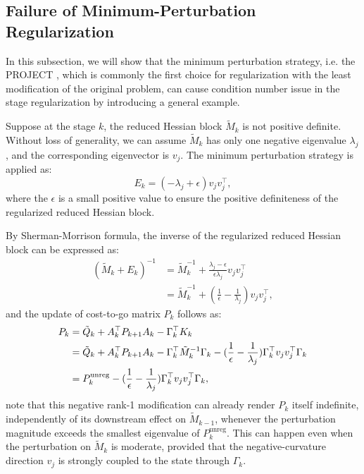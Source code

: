 \documentclass[class=scrbook, crop=false]{standalone}
\begin{document}
\subsection{Failure of Minimum-Perturbation Regularization}
In this subsection, we will show that the minimum perturbation strategy, i.e. the PROJECT \cite{verschueren2017sparsity}, 
which is commonly the first choice for regularization with the least modification of the original problem, 
can cause condition number issue in the stage regularization by introducing a general example.

Suppose at the stage $k$, the reduced Hessian block $\tilde{M}_k$ is not positive definite.
Without loss of generality, we can assume $\tilde{M}_k$ has only one negative eigenvalue $\lambda_j$, and the corresponding eigenvector is $v_j$.
The minimum perturbation strategy is applied as:
\begin{equation}
    E_k = (-\lambda_{j}+\epsilon) v_j v_j^\top,
\end{equation}
where the $\epsilon$ is a small positive value to ensure the positive definiteness of the regularized reduced Hessian block. 

By Sherman-Morrison formula, the inverse of the regularized reduced Hessian block can be expressed as:
\begin{align*}
    (\tilde{M}_k + E_k)^{-1} &= \tilde{M}_k^{-1} + \frac{\lambda_j-\epsilon}{\epsilon \lambda_j} v_j v_j^\top \\
                            &= \tilde{M}_k^{-1} + (\frac{1}{\epsilon} - \frac{1}{\lambda_j}) v_j v_j^\top,
\end{align*}
and the update of cost-to-go matrix $P_k$ follows as:
\begin{align}
    P_k &= \tilde{Q}_k + A_k^\top P_{k+1} A_k - \Gamma_k^\top K_k \notag \\
        &=\tilde{Q}_k + A_k^\top P_{k+1} A_k - \Gamma_k^\top \tilde{M}_k^{-1} \Gamma_k - (\frac{1}{\epsilon} - \frac{1}{\lambda_j}) \Gamma_k^\top v_j v_j^\top \Gamma_k \notag \\
        &= P_k^{\mathrm{unreg}} - (\frac{1}{\epsilon} - \frac{1}{\lambda_j}) \Gamma_k^\top v_j v_j^\top \Gamma_k,
\end{align}
note that this negative rank-1 modification can already render $P_k$ itself indefinite, 
independently of its downstream effect on $\tilde{M}_{k-1}$, 
whenever the perturbation magnitude exceeds the smallest eigenvalue of $P_k^{\mathrm{unreg}}$. 
This can happen even when the perturbation on $\tilde{M}_k$ is moderate,
provided that the negative-curvature direction $v_j$ is strongly coupled to the state through $\Gamma_k$.
\end{document}
